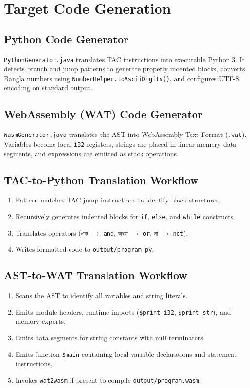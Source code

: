 \documentclass[12pt, a4paper]{report}
\begin{document}
\chapter{Target Code Generation}

\section{Python Code Generator}
\texttt{PythonGenerator.java} translates TAC instructions into executable Python 3. It detects branch and jump patterns to generate properly indented blocks, converts Bangla numbers using \texttt{NumberHelper.toAsciiDigits()}, and configures UTF-8 encoding on standard output.

\section{WebAssembly (WAT) Code Generator}
\texttt{WasmGenerator.java} translates the AST into WebAssembly Text Format (\texttt{.wat}). Variables become local \texttt{i32} registers, strings are placed in linear memory data segments, and expressions are emitted as stack operations.

\section{TAC-to-Python Translation Workflow}
\begin{enumerate}
    \item Pattern-matches TAC jump instructions to identify block structures.
    \item Recursively generates indented blocks for \texttt{if}, \texttt{else}, and \texttt{while} constructs.
    \item Translates operators (\texttt{এবং} $\rightarrow$ \texttt{and}, \texttt{অথবা} $\rightarrow$ \texttt{or}, \texttt{না} $\rightarrow$ \texttt{not}).
    \item Writes formatted code to \texttt{output/program.py}.
\end{enumerate}

\section{AST-to-WAT Translation Workflow}
\begin{enumerate}
    \item Scans the AST to identify all variables and string literals.
    \item Emits module headers, runtime imports (\texttt{\$print\_i32}, \texttt{\$print\_str}), and memory exports.
    \item Emits data segments for string constants with null terminators.
    \item Emits function \texttt{\$main} containing local variable declarations and statement instructions.
    \item Invokes \texttt{wat2wasm} if present to compile \texttt{output/program.wasm}.
\end{enumerate}
\end{document}
